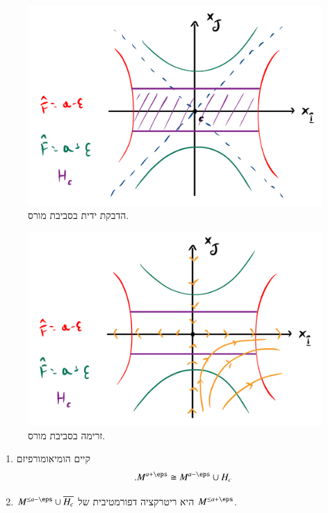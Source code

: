 \documentclass[a4paper,10pt,twoside,openany]{book}
\begin{document}
\begin{figure}
\centering
\includegraphics[scale=0.5]{sources/2.4}
\caption{הדבקת ידית בסביבת מורס.}
\label{2.4}
\end{figure}

\begin{figure}
\centering
\includegraphics[scale=0.5]{sources/2.5}
\caption{זרימה בסביבת מורס.}
\label{2.5}
\end{figure}

\begin{proposition}
\begin{enumerate}
\item קיים הומיאומורפיזם
\[\text{.} M^{a+\eps} \cong M^{a-\eps} \cup H_c\]

\item $M^{\leq a - \eps} \cup \overline{H_c}$
היא ריטרקציה דפורמטיבית של
$M^{\leq a + \eps}$.
\end{enumerate}
\end{proposition}
\end{document}
